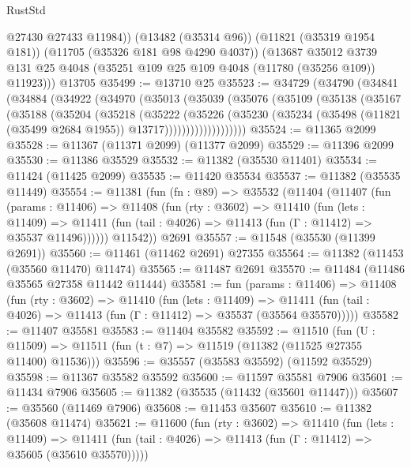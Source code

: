 \begin{lexlean}{RustStd}
\begin{coremodule}
          @27430
          @27433
          @11984))
      (@13482 (@35314 @96))
      (@11821 (@35319 @1954 @181))
      (@11705 (@35326 @181 @98 @4290 @4037))
      (@13687
        @35012
        @3739
        @131
        @25
        @4048
        (@35251 @109 @25 @109 @4048 (@11780 (@35256 @109)) @11923)))
    @13705
@35499 := @13710 @25
@35523 := @34729
    (@34790
      (@34841
        (@34884
          (@34922
            (@34970
              (@35013
                (@35039
                  (@35076
                    (@35109
                      (@35138
                        (@35167
                          (@35188
                            (@35204
                              (@35218
                                (@35222
                                  (@35226
                                    (@35230
                                      (@35234
                                        (@35498
                                          (@11821 (@35499 @2684 @1955))
                                          @13717)))))))))))))))))))
@35524 := @11365 @2099
@35528 := @11367 (@11371 @2099) (@11377 @2099)
@35529 := @11396 @2099
@35530 := @11386 @35529
@35532 := @11382 (@35530 @11401)
@35534 := @11424 (@11425 @2099)
@35535 := @11420 @35534
@35537 := @11382 (@35535 @11449)
@35554 := @11381
    (fun (fn : @89) =>
    @35532
      (@11404
        (@11407
          (fun (params : @11406) =>
          @11408
            (fun (rty : @3602) =>
            @11410
              (fun (lets : @11409) =>
              @11411 (fun (tail : @4026) => @11413 (fun (Γ : @11412) => @35537 @11496))))))
        @11542))
    @2691
@35557 := @11548 (@35530 (@11399 @2691))
@35560 := @11461 (@11462 @2691) @27355
@35564 := @11382 (@11453 (@35560 @11470) @11474)
@35565 := @11487 @2691
@35570 := @11484 (@11486 @35565 @27358 @11442 @11444)
@35581 := fun (params : @11406) =>
  @11408
    (fun (rty : @3602) =>
    @11410
      (fun (lets : @11409) =>
      @11411 (fun (tail : @4026) => @11413 (fun (Γ : @11412) => @35537 (@35564 @35570)))))
@35582 := @11407 @35581
@35583 := @11404 @35582
@35592 := @11510
    (fun (U : @11509) => @11511 (fun (t : @7) => @11519 (@11382 (@11525 @27355 @11400) @11536)))
@35596 := @35557 (@35583 @35592) (@11592 @35529)
@35598 := @11367 @35582 @35592
@35600 := @11597 @35581 @7906
@35601 := @11434 @7906
@35605 := @11382 (@35535 (@11432 (@35601 @11447)))
@35607 := @35560 (@11469 @7906)
@35608 := @11453 @35607
@35610 := @11382 (@35608 @11474)
@35621 := @11600
    (fun (rty : @3602) =>
    @11410
      (fun (lets : @11409) =>
      @11411 (fun (tail : @4026) => @11413 (fun (Γ : @11412) => @35605 (@35610 @35570)))))

\end{coremodule}
\end{lexlean}
